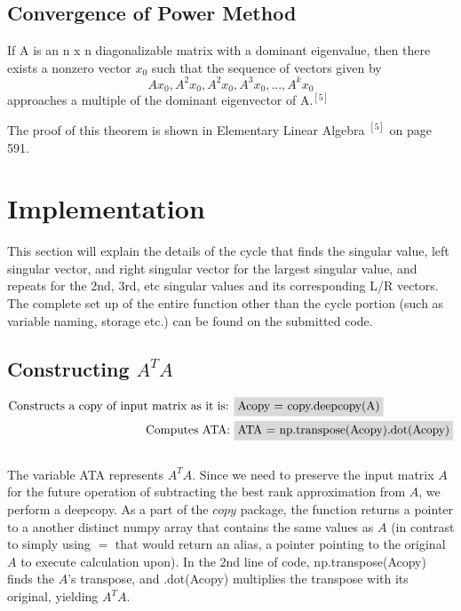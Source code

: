 \documentclass[12pt]{article}
\begin{document}
\vspace{-5pt}
\subsection{Convergence of Power Method}
If A is an n x n diagonalizable matrix with a dominant eigenvalue, then there exists a nonzero vector $x_0$ such that the sequence of vectors given by
$$Ax_0, A^2x_0, A^2x_0, A^3x_0,...,  A^kx_0$$
approaches a multiple of the dominant eigenvector of A.$^{[5]}$

The proof of this theorem is shown in Elementary Linear Algebra $^{[5]}$ on page 591.

\vspace{3pt}
\section{Implementation}
\vspace{-8pt}
This section will explain the details of the cycle that finds the singular value, left singular vector, and right singular vector for the largest singular value, and repeats for the 2nd, 3rd, etc singular values and its corresponding L/R vectors. The complete set up of the entire function other than the cycle portion (such as variable naming, storage etc.) can be found on the submitted code. 

\vspace{-8pt}
\subsection{Constructing $A^TA$}
\vspace{-13pt}
\begin{align*}
    \mbox{Constructs a copy of input matrix as it is:  } & \colorbox{gray!30}{Acopy = copy.deepcopy(A)}\\
    \mbox{Computes ATA:  } & \colorbox{gray!30}{ATA = np.transpose(Acopy).dot(Acopy)}
\end{align*}
\vspace{-8pt}\\
The variable ATA represents $A^TA$. Since we need to preserve the input matrix $A$ for the future operation of subtracting the best rank approximation from $A$, we perform a deepcopy. As a part of the $copy$ package, the function returns a pointer to a another distinct numpy array that contains the same values as $A$ (in contrast to simply using $=$ that would return an alias, a pointer pointing to the original $A$ to execute calculation upon). In the 2nd line of code,  \colorbox{gray!30}{np.transpose(Acopy)} finds the $A$'s transpose, and  \colorbox{gray!30}{.dot(Acopy)} multiplies the transpose with its original, yielding $A^TA$.
\end{document}
